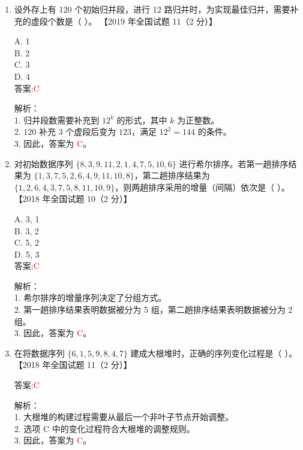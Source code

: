 \documentclass[lang=cn,newtx,10pt,scheme=chinese]{../../../elegantbook}
\begin{document}
\begin{enumerate}
\item 设外存上有 120 个初始归并段，进行 12 路归并时，为实现最佳归并，需要补充的虚段个数是（ ）。  
    【2019 年全国试题 11（2 分）】  

    A. 1 \\  
    B. 2 \\  
    C. 3 \\  
    D. 4 \\  

    答案:\textcolor{red}{C}

    解析：\\
    1. 归并段数需要补充到 $12^k$ 的形式，其中 $k$ 为正整数。\\
    2. $120$ 补充 $3$ 个虚段后变为 $123$，满足 $12^2 = 144$ 的条件。\\
    3. 因此，答案为 \textcolor{red}{C}。\\

\item 对初始数据序列 $\{8, 3, 9, 11, 2, 1, 4, 7, 5, 10, 6\}$ 进行希尔排序。若第一趟排序结果为 $\{1, 3, 7, 5, 2, 6, 4, 9, 11, 10, 8\}$，第二趟排序结果为 $\{1, 2, 6, 4, 3, 7, 5, 8, 11, 10, 9\}$，则两趟排序采用的增量（间隔）依次是（ ）。  
    【2018 年全国试题 10（2 分）】  

    A. 3, 1 \\  
    B. 3, 2 \\  
    C. 5, 2 \\  
    D. 5, 3 \\  

    答案:\textcolor{red}{C}

    解析：\\
    1. 希尔排序的增量序列决定了分组方式。\\
    2. 第一趟排序结果表明数据被分为 5 组，第二趟排序结果表明数据被分为 2 组。\\
    3. 因此，答案为 \textcolor{red}{C}。\\

\item 在将数据序列 $\{6, 1, 5, 9, 8, 4, 7\}$ 建成大根堆时，正确的序列变化过程是（ ）。  
    【2018 年全国试题 11（2 分）】  

    答案:\textcolor{red}{C}

    解析：\\
    1. 大根堆的构建过程需要从最后一个非叶子节点开始调整。\\
    2. 选项 C 中的变化过程符合大根堆的调整规则。\\
    3. 因此，答案为 \textcolor{red}{C}。\\



\end{enumerate}
\end{document}
